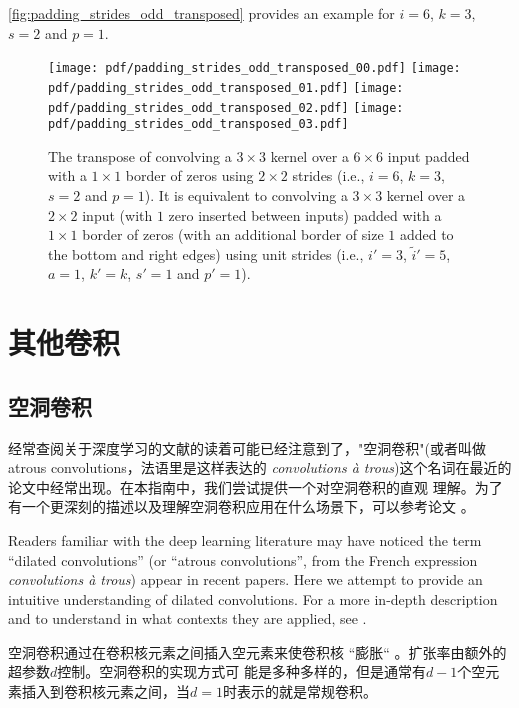 \documentclass[notitlepage]{report}
\begin{document}
\autoref{fig:padding_strides_odd_transposed} provides an example for $i = 6$, $k
= 3$, $s = 2$ and $p = 1$.

\begin{figure}[p]
    \centering
    \texttt{[image: pdf/padding\_strides\_odd\_transposed\_00.pdf]}
    \texttt{[image: pdf/padding\_strides\_odd\_transposed\_01.pdf]}
    \texttt{[image: pdf/padding\_strides\_odd\_transposed\_02.pdf]}
    \texttt{[image: pdf/padding\_strides\_odd\_transposed\_03.pdf]}
    \caption{\label{fig:padding_strides_odd_transposed} The transpose of
        convolving a $3 \times 3$ kernel over a $6 \times 6$ input padded with a
        $1 \times 1$ border of zeros using $2 \times 2$ strides (i.e., $i = 6$,
        $k = 3$, $s = 2$ and $p = 1$). It is equivalent to convolving a $3
        \times 3$ kernel over a $2 \times 2$ input (with $1$ zero inserted
        between inputs) padded with a $1 \times 1$ border of zeros (with an
        additional border of size $1$ added to the bottom and right edges) using
        unit strides (i.e., $i' = 3$, $\tilde{i}' = 5$, $a = 1$, $k' = k$, $s' =
        1$ and $p' = 1$).}
\end{figure}

\chapter{其他卷积}

\section{空洞卷积}

经常查阅关于深度学习的文献的读着可能已经注意到了，"空洞卷积"(或者叫做atrous convolutions，法语里是这样表达的
{\em convolutions \`{a} trous})这个名词在最近的论文中经常出现。在本指南中，我们尝试提供一个对空洞卷积的直观
理解。为了有一个更深刻的描述以及理解空洞卷积应用在什么场景下，可以参考论文
\citet{chen2014semantic,yu2015multi}。

Readers familiar with the deep learning literature may have noticed the term
``dilated convolutions'' (or ``atrous convolutions'', from the French expression
{\em convolutions \`{a} trous}) appear in recent papers. Here we attempt to
provide an intuitive understanding of dilated convolutions. For a more in-depth
description and to understand in what contexts they are applied, see
\citet{chen2014semantic,yu2015multi}.

空洞卷积通过在卷积核元素之间插入空元素来使卷积核 ``膨胀`` 。扩张率由额外的超参数$d$控制。空洞卷积的实现方式可
能是多种多样的，但是通常有$d - 1$个空元素插入到卷积核元素之间，当$d = 1$时表示的就是常规卷积。
\end{document}
